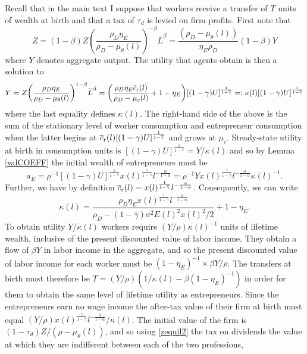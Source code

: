 \documentclass[11pt]{article}
\theoremstyle{plain}
\begin{document}
Recall that in the main text I suppose that workers receive a transfer of $T$ units of wealth at birth and that a tax of $\tau_d$ is levied on firm profits. First note that
\begin{equation}
\overline{Z} = (1-\beta)Z{\left(\frac{\rho_D\eta_E}{\rho_D - \mu_{\theta}(l)} \right)}^{-\beta}\overline{L}^{\beta} = \frac{(\rho_D - \mu_{\theta}(l))}{\eta_E \rho_D}(1-\beta)Y
\label{zequil2}
\end{equation}
where $Y$ denotes aggregate output. The utility that agents obtain is then a solution to
$$ 
Y = Z{\left(\frac{\rho_D\eta_E}{\rho_D - \mu_{\theta}(l)} \right)}^{1-\beta}\overline{L}^{\beta} = {\left(\frac{\rho_D \eta_E\overline{c}_{\textnormal{r}}(l)}{\rho_D - \mu_c(l)} + 1 - \eta_E\right)}[(1-\gamma)U]^{\frac{1}{1-\overline{\gamma}}} =: \kappa(l)[(1-\gamma)U]^{\frac{1}{1-\overline{\gamma}}}
$$
where the last equality defines $\kappa(l)$. The right-hand side of the above is the sum of the stationary level of worker consumption and entrepreneur consumption when the latter begins at $\overline{c}_{\textnormal{r}}(l)[(1-\gamma)U]^{\frac{1}{1-\overline{\gamma}}}$ and grows at $\mu_c$. Steady-state utility at birth in consumption units is $[(1-\gamma)U]^{\frac{1}{1-\overline{\gamma}}} = Y/\kappa(l)$ and so by Lemma \ref{valCOEFF} the initial wealth of entrepreneurs must be 
$$
a_E = \rho^{-1} [(1-\gamma)U]^{\frac{1}{1-\overline{\gamma}}}x(l)^{\frac{\overline{\gamma}}{1-\overline{\gamma}}}l^{-\frac{\alpha}{1-\alpha}} = \rho^{-1}Yx(l)^{\frac{\overline{\gamma}}{1-\overline{\gamma}}}l^{-\frac{\alpha}{1-\alpha}}  \kappa(l)^{-1}.
$$
Further, we have by definition $\overline{c}_{\textnormal{r}}(l) = x(l)^{\frac{1}{1-\overline{\gamma}}}l^{-\frac{\alpha}{1-\alpha}}$. Consequently, we can write 
\begin{equation}
\kappa(l) = \frac{\rho_D \eta_E x(l)^{\frac{1}{1-\overline{\gamma}}}l^{-\frac{\alpha}{1-\alpha}}}{\rho_D - (1-\overline{\gamma})\sigma^2 E(l)^2 x(l)^2/2} + 1 - \eta_E.
\label{kappa}
\end{equation}
To obtain utility $Y/\kappa(l)$ workers require $(Y/\rho)\kappa(l)^{-1}$ units of lifetime wealth, inclusive of the present discounted value of labor income. They obtain a flow of $\beta Y$ in labor income in the aggregate, and so the present discounted value of labor income for each worker must be $(1-\eta_E)^{-1} \times \beta Y/\rho$. The transfers at birth must therefore be $T = (Y/\rho)(1/\kappa(l) - \beta (1-\eta_E)^{-1})$ in order for them to obtain the same level of lifetime utility as entrepreneurs. Since the entrepreneurs earn no wage income the after-tax value of their firm at birth must equal $(Y/\rho) x(l)^{\frac{\overline{\gamma}}{1-\overline{\gamma}}}l^{-\frac{\alpha}{1-\alpha}}/\kappa(l)$. The initial value of the firm is $(1-\tau_d)\overline{Z}/(\rho - \mu_{\theta}(l))$, and so using \eqref{zequil2} the tax on dividends the value at which they are indifferent between each of the two professions,
\end{document}
